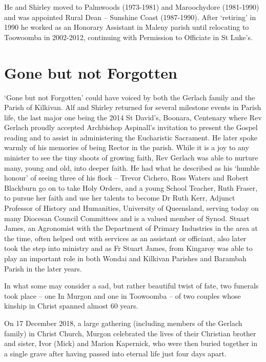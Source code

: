He and Shirley moved to Palmwoods (1973-1981) and Maroochydore (1981-1990) and was appointed Rural Dean -- Sunshine Coast (1987-1990). After `retiring' in 1990 he worked as an Honorary Assistant in Maleny parish until relocating to Toowoomba in 2002-2012, continuing with Permission to Officiate in St Luke's.



\section{Gone but not Forgotten}



`Gone but not Forgotten' could have voiced by both the Gerlach family and the Parish of Kilkivan. Alf and Shirley returned for several milestone events in Parish life, the last major one being the 2014 St David's, Boonara, Centenary where Rev Gerlach proudly accepted Archbishop Aspinall's invitation to present the Gospel reading and to assist in administering the Eucharistic Sacrament. He later spoke warmly of his memories of being Rector in the parish. While it is a joy to any minister to see the tiny shoots of growing faith, Rev Gerlach was able to nurture many, young and old, into deeper faith. He had what he described as his `humble honour' of seeing three of his flock -- Trevor Cichero, Ross Waters and Robert Blackburn go on to take Holy Orders, and a young School Teacher, Ruth Fraser, to pursue her faith and use her talents to become Dr Ruth Kerr, Adjunct Professor of History and Humanities, University of Queensland, serving today on many Diocesan Council Committees and is a valued member of Synod. Stuart James, an Agronomist with the Department of Primary Industries in the area at the time, often helped out with services as an assistant or officiant, also later took the step into ministry and as Fr Stuart James, from Kingaroy was able to play an important role in both Wondai and Kilkivan Parishes and Barambah Parish in the later years.



In what some may consider a sad, but rather beautiful twist of fate, two funerals took place -- one In Murgon and one in Toowoomba -- of two couples whose kinship in Christ spanned almost 60 years.



On 17 December 2018, a large gathering (including members of the Gerlach family) in Christ Church, Murgon celebrated the lives of their Christian brother and sister, Ivor (Mick) and Marion Kapernick, who were then buried together in a single grave after having passed into eternal life just four days apart.



